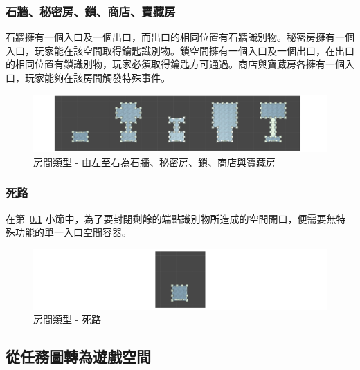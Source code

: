 \subsubsection{石牆、秘密房、鎖、商店、寶藏房}
\label{sssec:method-spacepieces-types-special}

石牆擁有一個入口及一個出口，而出口的相同位置有石牆識別物。秘密房擁有一個入口，玩家能在該空間取得鑰匙識別物。鎖空間擁有一個入口及一個出口，在出口的相同位置有鎖識別物，玩家必須取得鑰匙方可通過。商店與寶藏房各擁有一個入口，玩家能夠在該房間觸發特殊事件。

\begin{figure}[ht]
  \begin{center}
    \includegraphics[width=1.0\textwidth]{figures/roomtype-special.png}
    \caption{房間類型 - 由左至右為石牆、秘密房、鎖、商店與寶藏房}
    \label{fig:roomtype-special}
  \end{center}
\end{figure}

\subsubsection{死路}
\label{sssec:method-spacepieces-types-wall}

在第~\ref{ssec:method-spacepieces-frommissiontospace} 小節中，為了要封閉剩餘的端點識別物所造成的空間開口，便需要無特殊功能的單一入口空間容器。

\begin{figure}[ht]
  \begin{center}
    \includegraphics[width=1.0\textwidth]{figures/roomtype-wall.png}
    \caption{房間類型 - 死路}
    \label{fig:roomtype-wall}
  \end{center}
\end{figure}

\subsection{從任務圖轉為遊戲空間}
\label{ssec:method-spacepieces-frommissiontospace}


